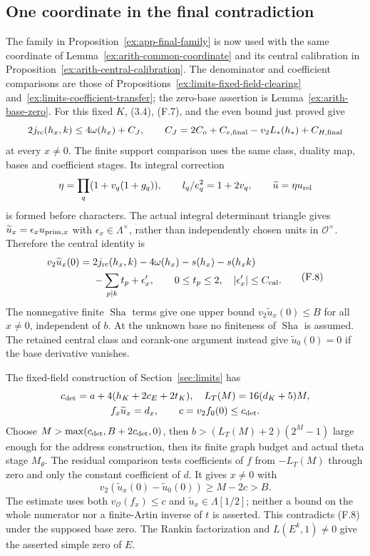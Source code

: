 \documentclass[11pt]{article}
\theoremstyle{definition}
\theoremstyle{remark}
\providecommand{\mathscr}[1]{\mathcal{#1}}
\newcommand{\Sha}{\operatorname{Sha}}
\begin{document}
\subsection{One coordinate in the final contradiction}
The family in Proposition~\ref{ex:app-final-family} is now used with
the same coordinate of Lemma~\ref{ex:arith-common-coordinate}
and its central calibration in
Proposition~\ref{ex:arith-central-calibration}. The denominator and
coefficient comparisons are those of
Propositions~\ref{ex:limits-fixed-field-clearing}
and~\ref{ex:limits-coefficient-transfer}; the zero-base assertion is
Lemma~\ref{ex:arith-base-zero}.
For this fixed $K$, (3.4), (F.7), and the even bound just proved give
\[
 2j_{\rm rc}(h_x,k)\le4\omega(h_x)+C_J,\qquad
 C_J=2C_o+C_{e,\rm final}-v_2L_*(h_*)+C_{H,\rm final}
\]
at every $x\ne0$.
The finite support comparison uses the same class, duality map,
bases and coefficient stages. Its integral correction
\[
 \eta=\prod_q(1+v_q(1+g_q)),\qquad l_q/e_q^2=1+2v_q,
 \qquad \widetilde u=\eta u_{\rm rel}
\]
is formed before characters. The actual integral determinant
triangle gives $\widetilde u_x=\epsilon_xu_{{\rm prim},x}$ with
$\epsilon_x\in\Lambda^\times$, rather than independently chosen
units in $\mathscr O^\times$. Therefore the central identity is
\[
 \begin{split}
 v_2\widetilde u_x(0)={}&2j_{\rm rc}(h_x,k)-4\omega(h_x)
       -s(h_x)-s(h_xk)\\
       &-\sum_{p\mid k}t_p+\epsilon'_x,\qquad
 0\le t_p\le2,\quad |\epsilon'_x|\le C_{\rm cal}.
 \end{split}                                                    \tag{F.8}
\]
The nonnegative finite $\Sha$ terms give one upper bound
$v_2\widetilde u_x(0)\le B$ for all $x\ne0$, independent of $b$.
At the unknown base no finiteness of $\Sha$ is assumed.
The retained central class and corank-one argument instead give
$\widetilde u_0(0)=0$ if the base derivative vanishes.

The fixed-field construction of Section~\ref{sec:limits} has
\[
 \begin{gathered}
 c_{\rm det}=a+4(h_K+2c_E+2t_K),\quad
 L_T(M)=16(d_K+5)M,\\
 f_x\widetilde u_x=d_x,\qquad
 c=v_2f_0(0)\le c_{\rm det}.
 \end{gathered}
\]
Choose $M>\max(c_{\rm det},B+2c_{\rm det},0)$, then
$b>(L_T(M)+2)(2^M-1)$ large enough for the address construction,
then its finite graph budget and actual theta stage $M_\theta$.
The residual comparison tests coefficients of $f$ from
$-L_T(M)$ through zero and only the constant coefficient of $d$.
It gives $x\ne0$ with
\[
       v_2(\widetilde u_x(0)-\widetilde u_0(0))\ge M-2c>B.
\]
The estimate uses both $v_{\mathscr O}(f_x)\le c$ and
$\widetilde u_x\in\Lambda[1/2]$; neither a bound on the whole
numerator nor a finite-Artin inverse of $t$ is asserted.
This contradicts (F.8) under the supposed base zero.
The Rankin factorization and $L(E^k,1)\ne0$ give the asserted
simple zero of $E$.
\end{document}
